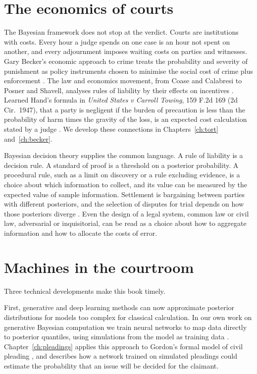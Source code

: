 \section{The economics of courts}

The Bayesian framework does not stop at the verdict. Courts are institutions with costs. Every hour a judge spends on one case is an hour not spent on another, and every adjournment imposes waiting costs on parties and witnesses. Gary Becker's economic approach to crime treats the probability and severity of punishment as policy instruments chosen to minimise the social cost of crime plus enforcement \citep{becker1968}. The law and economics movement, from Coase and Calabresi to Posner and Shavell, analyses rules of liability by their effects on incentives \citep{coase1960,calabresi1970,shavell1987,posner2014}. Learned Hand's formula in \emph{United States v Carroll Towing}, 159 F.2d 169 (2d Cir.\ 1947), that a party is negligent if the burden of precaution is less than the probability of harm times the gravity of the loss, is an expected cost calculation stated by a judge \citep{posner2014}. We develop these connections in Chapters~\ref{ch:tort} and~\ref{ch:becker}.

Bayesian decision theory supplies the common language. A rule of liability is a decision rule. A standard of proof is a threshold on a posterior probability. A procedural rule, such as a limit on discovery or a rule excluding evidence, is a choice about which information to collect, and its value can be measured by the expected value of sample information. Settlement is bargaining between parties with different posteriors, and the selection of disputes for trial depends on how those posteriors diverge \citep{priest_klein1984}. Even the design of a legal system, common law or civil law, adversarial or inquisitorial, can be read as a choice about how to aggregate information and how to allocate the costs of error.

\section{Machines in the courtroom}

Three technical developments make this book timely.

First, generative and deep learning methods can now approximate posterior distributions for models too complex for classical calculation. In our own work on generative Bayesian computation we train neural networks to map data directly to posterior quantiles, using simulations from the model as training data \citep{polson_sokolov_gbc}. Chapter~\ref{ch:pleadings} applies this approach to Gordon's formal model of civil pleading \citep{gordon1995}, and describes how a network trained on simulated pleadings could estimate the probability that an issue will be decided for the claimant.

